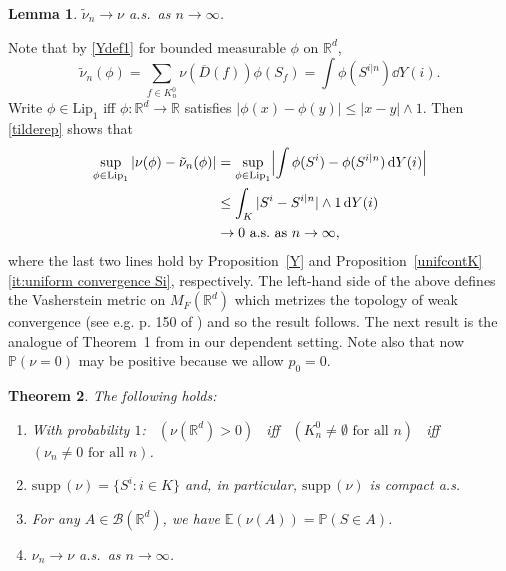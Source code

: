 \documentclass[12pt]{article}
\makeatletter
\renewenvironment{proof}[1][\proofname]{%
\par\pushQED{\qed}\normalfont%
\topsep6\p@\@plus6\p@\relax
\trivlist\item[\hskip\labelsep\bfseries#1\@addpunct{.}]%
\ignorespaces
}{%
\popQED\endtrivlist\@endpefalse
}
\newtheorem{theorem}{Theorem}
\numberwithin{theorem}{section}
\newtheorem{lemma}[theorem]{Lemma}
\theoremstyle{def}
\numberwithin{equation}{section}
\renewcommand{\P}{\mathbb{P}}
\newcommand{\E}{\mathbb{E}}
\newcommand{\R}{\mathbb{R}}
\newcommand{\cB}{\mathcal B}
\newcommand{\supp}{\mathrm{supp}}
\makeatother
\begin{document}
\begin{lemma}\label{tildenu} $\tilde \nu_n\to \nu$ a.s.\ as $n\to \infty$.
\end{lemma}
\begin{proof} 
Note that by \eqref{Ydef1} for bounded measurable $\phi$ on $\R^d$,
\begin{equation}\label{tilderep}
\tilde\nu_n(\phi)=\sum_{f\in K^0_n}\nu(\overline D(f))\phi(S_f)=\int\phi(S^{i|n})\dd Y(i).
\end{equation}
Write $\phi\in\text{Lip}_1$ iff $\phi:\R^d\to \R$ satisfies $|\phi(x)-\phi(y)|\le |x-y|\wedge 1$. 
Then \eqref{tilderep} shows that 
\begin{align*}
\sup_{\phi\in\text{Lip}_1}|\nu(\phi)-\tilde \nu_n(\phi)|&=\sup_{\phi\in\text{Lip}_1}\Bigl|\int \phi(S^i)-\phi(S^{i|n})\,\dd Y(i)\Bigr|\\
&\le\int_K |S^i-S^{i|n}|\wedge 1\,\dd Y(i)\\
&\to 0\text{ a.s.\ as }n\to\infty,
\end{align*}
where the last two lines hold by Proposition~\ref{Y} and Proposition~\ref{unifcontK}\ref{it:uniform convergence Si}, respectively. The left-hand side of the above defines the Vasherstein metric on $M_F(\R^d)$ which metrizes the topology of weak convergence (see e.g. p. 150 of \cite{EK}) and so the result follows.
\end{proof}
The next result is the analogue of Theorem~1 from \cite{ADHP} in our dependent setting. Note also that now $\P(\nu=0)$ may be positive because we allow $p_0=0$.
\begin{theorem}\label{nuprops} The following holds:
\begin{enumerate}[label=\emph{(\alph*)}, ref=(\alph*)]
\item\label{it:nuprops:a} With probability $1$: \ $(\nu(\R^d)>0)$ \  iff \ $(K^0_n\neq\emptyset \text{ for all }n) $   \ iff \  $(\nu_n\neq 0\text{ for all }n)$.
\item\label{it:nuprops:b} $\supp\,(\nu)=\{S^i:i\in K\}$ and, in particular, $\supp\,(\nu)$ is compact a.s. 
\item\label{it:nuprops:c} For any $A\in\cB(\R^d)$, we have $\E(\nu(A))=\P(S\in A)$.
\item\label{it:nuprops:d} $\nu_n\to\nu$ a.s.\ as $n\to\infty$.
\end{enumerate}
\end{theorem}
\end{document}
